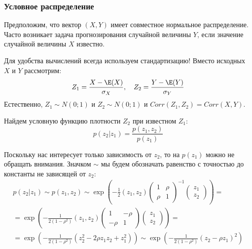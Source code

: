 \subsubsection*{Условное распределение}

Предположим, что вектор $(X,Y)$ имеет совместное нормальное распределение. Часто возникает задача прогнозирования случайной величины $Y$, если значение случайной величины $X$ известно.


Для удобства вычислений всегда используем стандартизацию! Вместо исходных $X$ и $Y$ рассмотрим:
\begin{equation}
Z_{1}=\frac{X-\E(X)}{\sigma_{X}}, \quad Z_{2}=\frac{Y-\E(Y)}{\sigma_{Y}}
\end{equation}
Естественно, $Z_{1}\sim N(0;1)$ и $Z_{2}\sim N(0;1)$ и $Corr(Z_{1},Z_{2})=Corr(X,Y)$.

Найдем условную функцию плотности $Z_{2}$ при известном $Z_{1}$:
\begin{equation}
p(z_{2}|z_{1})=\frac{p(z_{1},z_{2})}{p(z_{1})}
\end{equation}

Поскольку нас интересует только зависимость от $z_{2}$, то на $p(z_{1})$ можно не обращать внимания. Значком $\sim$ мы будем обозначать равенство с точностью до константы не зависящей от $z_{2}$:
\begin{multline}
p(z_{2}|z_{1})\sim p(z_{1},z_{2})\sim \exp\left(-\frac{1}{2}(z_{1},z_{2})\left(\begin{matrix}
1 & \rho \\ 
\rho & 1
\end{matrix}\right)^{-1}\left( \begin{matrix}
z_{1} \\ 
z_{2}
\end{matrix}\right)   \right)=\\
=\exp\left(-\frac{1}{2(1-\rho^{2})}(z_{1},z_{2})\left(\begin{matrix}
1 & -\rho \\ 
-\rho & 1
\end{matrix}\right)\left( \begin{matrix}
z_{1} \\ 
z_{2}
\end{matrix}\right)   \right)= \\
=\exp\left(-\frac{1}{2(1-\rho^{2})}\left(z_{2}^{2}-2\rho z_{1}z_{2}+z_{1}^{2}\right) \right)\sim 
\exp\left(-\frac{1}{2(1-\rho^{2})}\left(z_{2}-\rho z_{1}\right)^{2}\right)
\end{multline}

